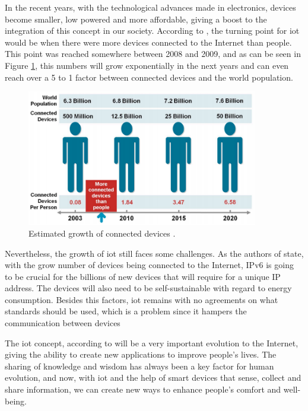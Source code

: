 In the recent years, with the technological advances made in electronics, devices become smaller, low powered and more affordable, giving a boost to the integration of this concept in our society. According to \cite{Evans2011}, the turning point for \ac{iot} would be when there were more devices connected to the Internet than people. This point was reached somewhere between 2008 and 2009, and as can be seen in Figure \ref{fig:iot_pic}, this numbers will grow exponentially in the next years and can even reach over a 5 to 1 factor between connected devices and the world population.

\begin{figure}[H]
	\centering
	\includegraphics[width=0.9\textwidth]{figures/iot_pic.png}
	\caption{Estimated growth of connected devices \cite{Evans2011}. }
	\label{fig:iot_pic}
\end{figure}

Nevertheless, the growth of \ac{iot} still faces some challenges. As the authors of \cite{Al-fuqaha2015} state, with the grow number of devices being connected to the Internet, IPv6 is going to be crucial for the billions of new devices that will require for a unique IP address. The devices will also need to be self-sustainable with regard to energy consumption. Besides this factors, \ac{iot} remains with no agreements on what standards should be used, which is a problem since it hampers the communication between devices


The \ac{iot} concept, according to \cite{Evans2011} will be a very important evolution to the Internet, giving the ability to create new applications to improve people's lives. The sharing of knowledge and wisdom has always been a key factor for human evolution, and now, with \ac{iot} and the help of smart devices that sense, collect and share information, we can create new ways to enhance people's comfort and well-being.

